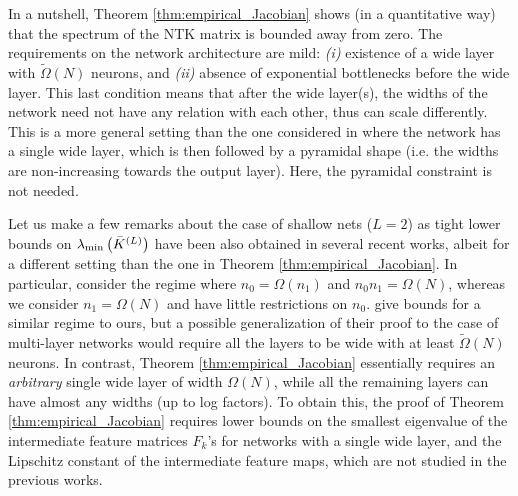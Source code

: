 \documentclass[11pt]{article}
\newcommand{\evmin}[1]{\lambda_{\rm min}\left(#1\right)}
\begin{document}
In a nutshell, Theorem \ref{thm:empirical_Jacobian} shows (in a quantitative way) that the spectrum of the NTK matrix is bounded away from zero. The requirements on the network architecture are mild:  \emph{(i)} existence of a wide layer with $\tilde{\Omega}(N)$ neurons, and \emph{(ii)} absence of exponential bottlenecks before the wide layer.
This last condition means that after the wide layer(s), the widths of the network need not have any relation with each other, thus can scale differently.
This is a more general setting than the one considered in \citep{QuynhICML2019,QuynhICML2017,QuynhMarco2020} 
where the network has a single wide layer, which is then followed by a pyramidal shape (i.e. the widths are non-increasing towards the output layer).
Here, the pyramidal constraint is not needed.

Let us make a few remarks about the case of shallow nets ($L=2$) as
tight lower bounds on $\evmin{\bar{K}^{(L)}}$ have been also obtained in several recent works,
albeit for a different setting than the one in Theorem \ref{thm:empirical_Jacobian}.
In particular, \citep{Andrea2020} consider the regime where $n_0=\Omega(n_1)$ and $n_0n_1=\Omega(N)$,
whereas we consider $n_1=\Omega(N)$ and have little restrictions on $n_0$. 
\citep{OymakMahdi2019} give bounds for a similar regime to ours, 
but a possible generalization of their proof to the case of multi-layer networks 
would require all the layers to be wide with at least $\tilde{\Omega}(N)$ neurons. 
In contrast, Theorem \ref{thm:empirical_Jacobian} essentially requires an {\em arbitrary} single wide layer of width $\Omega(N)$, while all the remaining layers
can have almost any widths (up to log factors).
To obtain this, the proof of Theorem \ref{thm:empirical_Jacobian} requires lower bounds on the smallest eigenvalue of the intermediate feature matrices $F_k$'s
for networks with a single wide layer, and the Lipschitz constant of the intermediate feature maps,
which are not studied in the previous works.
\end{document}
